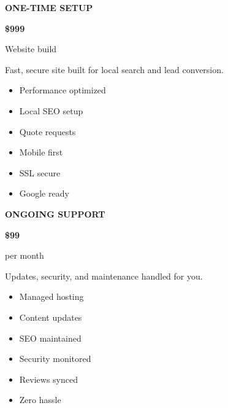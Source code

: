 \documentclass[11pt,letterpaper]{article}
\begin{document}
\noindent\begin{minipage}[t]{0.48\textwidth}
\begin{tcolorbox}[colframe=accent-teal!40, boxrule=1pt, left=0.7em, right=0.7em, top=0.7em, bottom=0.7em, arc=8pt, boxsep=0pt]

{\small\color{accent-teal}\bfseries ONE-TIME SETUP}

\vspace{0.2em}

{\Large\bfseries\color{text-dark}\$999}

{\small\color{text-light}Website build}

\vspace{0.2em}

{\small Fast, secure site built for local search and lead conversion.}

\vspace{0.2em}

\begin{itemize}
\item[\checkmark] Performance optimized
\item[\checkmark] Local SEO setup
\item[\checkmark] Quote requests
\item[\checkmark] Mobile first
\item[\checkmark] SSL secure
\item[\checkmark] Google ready
\end{itemize}

\end{tcolorbox}
\end{minipage}
\hfill
\begin{minipage}[t]{0.48\textwidth}
\begin{tcolorbox}[colframe=accent-teal!40, boxrule=1pt, left=0.7em, right=0.7em, top=0.7em, bottom=0.7em, arc=8pt, boxsep=0pt]

{\small\color{accent-teal}\bfseries ONGOING SUPPORT}

\vspace{0.2em}

{\Large\bfseries\color{text-dark}\$99}

{\small\color{text-light}per month}

\vspace{0.1em}

{\small Updates, security, and maintenance handled for you.}

\vspace{0.2em}

\begin{itemize}
\item[\checkmark] Managed hosting
\item[\checkmark] Content updates
\item[\checkmark] SEO maintained
\item[\checkmark] Security monitored
\item[\checkmark] Reviews synced
\item[\checkmark] Zero hassle
\end{itemize}

\end{tcolorbox}
\end{minipage}
\end{document}

